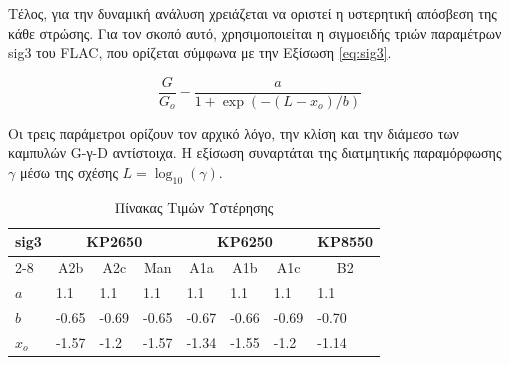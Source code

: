 Τέλος, για την δυναμική ανάλυση χρειάζεται να οριστεί η υστερητική απόσβεση της κάθε στρώσης. Για τον σκοπό αυτό, χρησιμοποιείται η σιγμοειδής τριών παραμέτρων sig3 του FLAC, που ορίζεται σύμφωνα με την Εξίσωση \ref{eq:sig3}.

\begin{equation}
	\frac{G}{G_o} - \frac{a}{1 + \exp{(-(L - x_o)/b)}}
	\label{eq:sig3}
\end{equation}

Οι τρεις παράμετροι ορίζουν τον αρχικό λόγο, την κλίση και την διάμεσο των καμπυλών G-γ-D αντίστοιχα. Η εξίσωση συναρτάται της διατμητικής παραμόρφωσης $\gamma$ μέσω της σχέσης $L = \log_{10}{(\gamma)}$.

\begin{table}[h]
	\centering
	\begin{tabular}{|l|lll|lll|l|}
		\hline
		\multicolumn{1}{|c|}{\multirow{2}{*}{sig3}} & \multicolumn{3}{c|}{KP2650}                                                        & \multicolumn{3}{c|}{KP6250}                                                        & \multicolumn{1}{c|}{KP8550} \\ \cline{2-8} 
		\multicolumn{1}{|c|}{}                      & \multicolumn{1}{c|}{A2b}   & \multicolumn{1}{c|}{A2c}   & \multicolumn{1}{c|}{Man} & \multicolumn{1}{c|}{A1a}   & \multicolumn{1}{c|}{A1b}   & \multicolumn{1}{c|}{A1c} & \multicolumn{1}{c|}{B2}     \\ \hline
		$a$                                         & \multicolumn{1}{l|}{1.1}   & \multicolumn{1}{l|}{1.1}   & 1.1                      & \multicolumn{1}{l|}{1.1}   & \multicolumn{1}{l|}{1.1}   & 1.1                      & 1.1                         \\ \hline
		$b$                                         & \multicolumn{1}{l|}{-0.65} & \multicolumn{1}{l|}{-0.69} & -0.65                    & \multicolumn{1}{l|}{-0.67} & \multicolumn{1}{l|}{-0.66} & -0.69                    & -0.70                       \\ \hline
		$x_o$                                       & \multicolumn{1}{l|}{-1.57} & \multicolumn{1}{l|}{-1.2}  & -1.57                    & \multicolumn{1}{l|}{-1.34} & \multicolumn{1}{l|}{-1.55} & -1.2                     & -1.14                       \\ \hline
	\end{tabular}
	\caption{Πίνακας Τιμών Υστέρησης}
	\label{tab:GγD}
\end{table}

